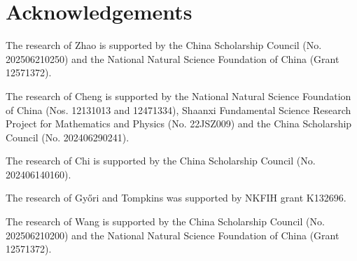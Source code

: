 \documentclass[11pt,a4paper]{article}
\theoremstyle{definition}
\begin{document}
    

\section{Acknowledgements}

    The research of Zhao is supported by the China Scholarship Council (No. 202506210250) and the National Natural Science Foundation of China (Grant 12571372).

    The research of Cheng is supported by the National Natural Science Foundation of China (Nos. 12131013 and 12471334), Shaanxi Fundamental Science Research Project for Mathematics and Physics (No. 22JSZ009) and the China Scholarship Council (No. 202406290241).

    The research of Chi is supported by the China Scholarship Council (No. 202406140160).

    The research of Gy\H{o}ri and Tompkins was supported by NKFIH grant K132696.

    The research of Wang is supported by the China Scholarship Council (No. 202506210200) and the National Natural Science Foundation of China (Grant 12571372).
    
    
\end{document}
